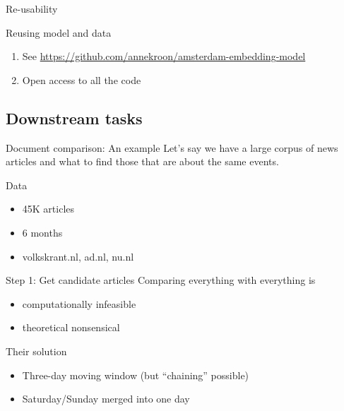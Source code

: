 \begin{frame}{Re-usability}
  \begin{block}{Reusing model and data}
    \begin{enumerate}
    \item See \url{https://github.com/annekroon/amsterdam-embedding-model}
    \item Open access to all the code
    \end{enumerate}
  \end{block}
\end{frame}



\subsection{Downstream tasks}


\begin{frame}{Document comparison: An example \parencite{Trilling2021}}
  Let's say we have a large corpus of news articles and what to find those that are about the same events.
  
\end{frame}


\begin{frame}{Data}
  \begin{itemize}
  \item 45K articles
  \item 6 months
  \item volkskrant.nl, ad.nl, nu.nl
  \end{itemize}
\end{frame}



\begin{frame}{Step 1: Get candidate articles}
  Comparing everything with everything is
  \begin{itemize}
  \item computationally infeasible
  \item theoretical nonsensical
  \end{itemize}
  
  \begin{block}{Their solution}
    \begin{itemize}
    \item Three-day moving window (but ``chaining'' possible)
    \item  Saturday/Sunday merged into one day
    \end{itemize}
  \end{block}
  
\end{frame}




